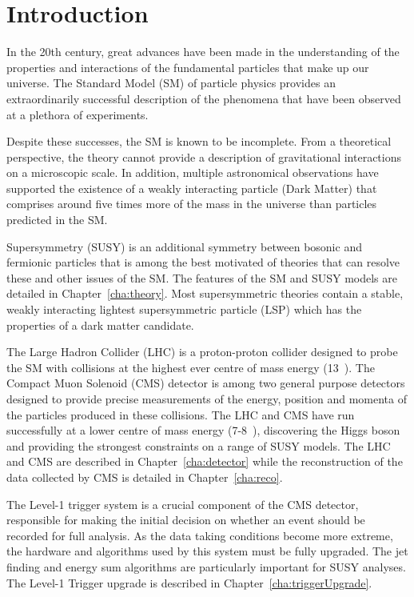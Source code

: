 \chapter{Introduction}
\label{cha:introduction}

In the 20th century, great advances have been made in the
understanding of the properties and interactions of 
the fundamental particles that make up our universe. 
The Standard Model (SM) of particle physics provides an 
extraordinarily successful description of the phenomena 
that have been observed at a plethora of experiments.

Despite these successes, the SM is known to be incomplete.
From a theoretical perspective, the theory cannot provide a description of gravitational
interactions on a microscopic scale. In addition, multiple astronomical observations 
have supported the existence of a weakly interacting particle (Dark Matter) that
comprises around five times more of the mass in the universe than particles 
predicted in the SM.

Supersymmetry (SUSY) is an additional symmetry between bosonic and fermionic particles 
that is among the best motivated of theories that can resolve these
and other issues of the SM. The features of the SM and SUSY models are detailed 
in Chapter~\ref{cha:theory}. Most supersymmetric theories contain a stable,
weakly interacting lightest supersymmetric particle (LSP) which has the properties 
of a dark matter candidate.

The Large Hadron Collider (LHC) is a proton-proton collider designed to probe the 
SM with collisions at the highest ever centre of mass energy (13~\TeV).
The Compact Muon Solenoid (CMS) detector is among two general purpose detectors
designed to provide precise measurements of the energy, position and momenta of
the particles produced in these collisions. The LHC and CMS have run successfully at a lower centre of 
mass energy (7-8~\TeV), discovering the Higgs boson and providing the strongest 
constraints on a range of SUSY models. The LHC and CMS are described in Chapter~\ref{cha:detector}
while the reconstruction of the data collected by CMS is detailed in Chapter~\ref{cha:reco}.

The Level-1 trigger system is a crucial component of the CMS detector, responsible 
for making the initial decision on whether an event should be recorded 
for full analysis. As the data taking conditions become more extreme, the hardware
and algorithms used by this system must be fully upgraded. The jet finding and energy sum algorithms 
are particularly important for SUSY analyses. The Level-1 Trigger upgrade is described in 
Chapter~\ref{cha:triggerUpgrade}. 

